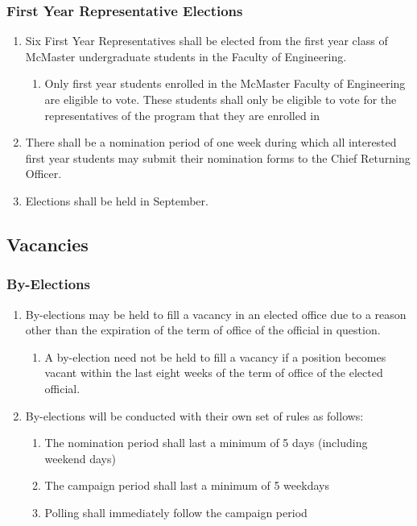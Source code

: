 \subsubsection{First Year Representative Elections}
\label{first-year-representative-elections}
\begin{enumerate}
 \item
  Six First Year Representatives shall be elected from the first year class of McMaster undergraduate students in the Faculty of Engineering.

  \begin{enumerate}
   \item
    Only first year students enrolled in the McMaster Faculty of Engineering are eligible to vote. These students shall only be eligible to vote for the representatives of the program that they are enrolled in
  \end{enumerate}
 \item
  There shall be a nomination period of one week during which all interested first year students may submit their nomination forms to the Chief Returning Officer.
 \item
  Elections shall be held in September.
\end{enumerate}

\subsection{Vacancies}
\label{vacancies}

\subsubsection{By-Elections}
\label{by-elections}

\begin{enumerate}
 \item
  By-elections may be held to fill a vacancy in an elected office due to a reason other than the expiration of the term of office of the official in question.

  \begin{enumerate}
   \item
    A by-election need not be held to fill a vacancy if a position becomes vacant within the last eight weeks of the term of office of the elected official.
  \end{enumerate}
 \item
  By-elections will be conducted with their own set of rules as follows:

  \begin{enumerate}
   \item
    The nomination period shall last a minimum of 5 days (including weekend days)
   \item
    The campaign period shall last a minimum of 5 weekdays
   \item
    Polling shall immediately follow the campaign period
  \end{enumerate}
\end{enumerate}


